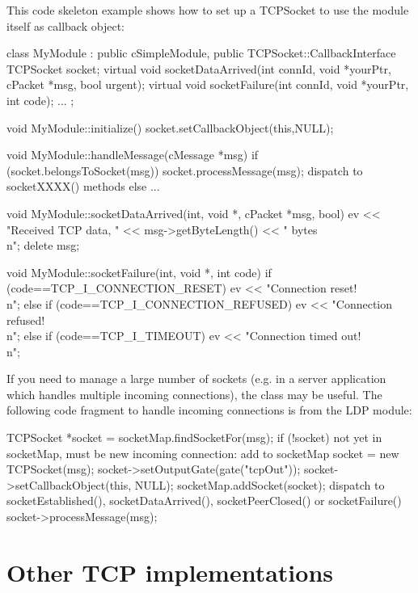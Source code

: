 This code skeleton example shows how to set up a TCPSocket to use the module
itself as callback object:

\begin{cpp}
class MyModule : public cSimpleModule, public TCPSocket::CallbackInterface
{
    TCPSocket socket;
    virtual void socketDataArrived(int connId, void *yourPtr,
                                   cPacket *msg, bool urgent);
    virtual void socketFailure(int connId, void *yourPtr, int code);
    ...
};

void MyModule::initialize() {
    socket.setCallbackObject(this,NULL);
}

void MyModule::handleMessage(cMessage *msg) {
    if (socket.belongsToSocket(msg))
        socket.processMessage(msg); dispatch to socketXXXX() methods
    else
        ...
}

void MyModule::socketDataArrived(int, void *, cPacket *msg, bool) {
    ev << "Received TCP data, " << msg->getByteLength() << " bytes\\n";
    delete msg;
}

void MyModule::socketFailure(int, void *, int code) {
    if (code==TCP_I_CONNECTION_RESET)
        ev << "Connection reset!\\n";
    else if (code==TCP_I_CONNECTION_REFUSED)
        ev << "Connection refused!\\n";
    else if (code==TCP_I_TIMEOUT)
        ev << "Connection timed out!\\n";
}
\end{cpp}

If you need to manage a large number of sockets (e.g. in a server
application which handles multiple incoming connections), the
 class may be useful. The following code
fragment to handle incoming connections is from the LDP module:

\begin{cpp}
TCPSocket *socket = socketMap.findSocketFor(msg);
if (!socket)
{
    not yet in socketMap, must be new incoming connection: add to socketMap
    socket = new TCPSocket(msg);
    socket->setOutputGate(gate("tcpOut"));
    socket->setCallbackObject(this, NULL);
    socketMap.addSocket(socket);
}
dispatch to socketEstablished(), socketDataArrived(), socketPeerClosed()
or socketFailure()
socket->processMessage(msg);
\end{cpp}

\section{Other TCP implementations}
\label{sec:other_tcp}

